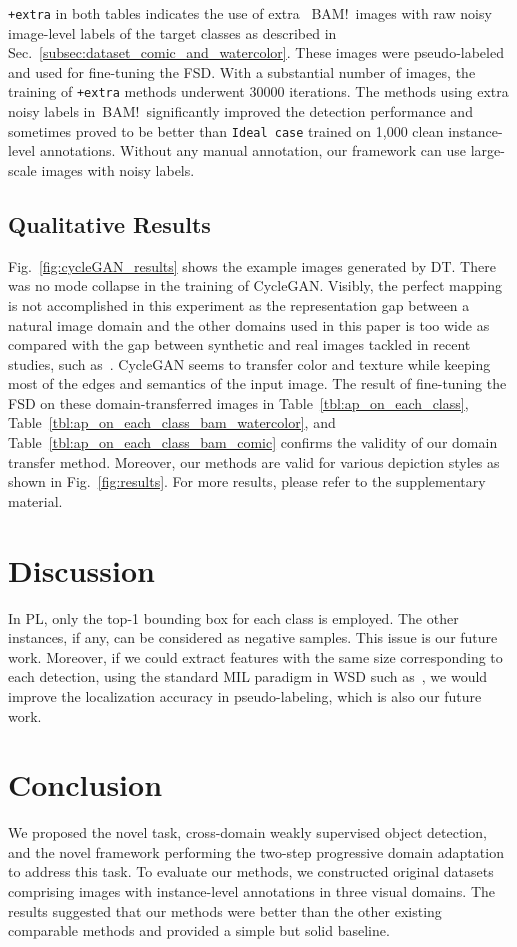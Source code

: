 \documentclass[10pt,twocolumn,letterpaper]{article}
\newcommand{\Tref}[1]{Table~\ref{#1}}
\newcommand{\Fref}[1]{Fig.~\ref{#1}}
\newcommand{\Sref}[1]{Sec.~\ref{#1}}
\newcommand{\bam}{BAM!}
\begin{document}
\texttt{+extra} in both tables indicates the use of extra ~\bam~images with raw noisy image-level labels of the target classes as described in \Sref{subsec:dataset_comic_and_watercolor}.
These images were pseudo-labeled and used for fine-tuning the FSD.
With a substantial number of images, the training of \texttt{+extra} methods underwent 30000 iterations.
The methods using extra noisy labels in~\bam~significantly improved the detection performance and sometimes proved to be better than \texttt{Ideal case} trained on 1,000 clean instance-level annotations.
Without any manual annotation, our framework can use large-scale images with noisy labels.

\subsection{Qualitative Results}
\label{subsec:qualitative_results}
\Fref{fig:cycleGAN_results} shows the example images generated by DT.
There was no mode collapse in the training of CycleGAN.
Visibly, the perfect mapping is not accomplished in this experiment as the representation gap between a natural image domain and the other domains used in this paper is too wide as compared with the gap between synthetic and real images tackled in recent studies, such as~\cite{shrivastava2017learning, bousmalis2017unsupervised}.
CycleGAN seems to transfer color and texture while keeping most of the edges and semantics of the input image.
The result of fine-tuning the FSD on these domain-transferred images in \Tref{tbl:ap_on_each_class}, \Tref{tbl:ap_on_each_class_bam_watercolor}, and \Tref{tbl:ap_on_each_class_bam_comic} confirms the validity of our domain transfer method.
Moreover, our methods are valid for various depiction styles as shown in \Fref{fig:results}.
For more results, please refer to the supplementary material.


\section{Discussion}
In PL, only the top-1 bounding box for each class is employed.
The other instances, if any, can be considered as negative samples.
This issue is our future work.
Moreover, if we could extract features with the same size corresponding to each detection, using the standard MIL paradigm in WSD such as~\cite{gokberk2014multi,li2016weakly}, we would improve the localization accuracy in pseudo-labeling, which is also our future work.

\section{Conclusion}
We proposed the novel task, cross-domain weakly supervised object detection, and the novel framework performing the two-step progressive domain adaptation to address this task.
To evaluate our methods, we constructed original datasets comprising images with instance-level annotations in three visual domains.
The results suggested that our methods were better than the other existing comparable methods and provided a simple but solid baseline.
\end{document}
